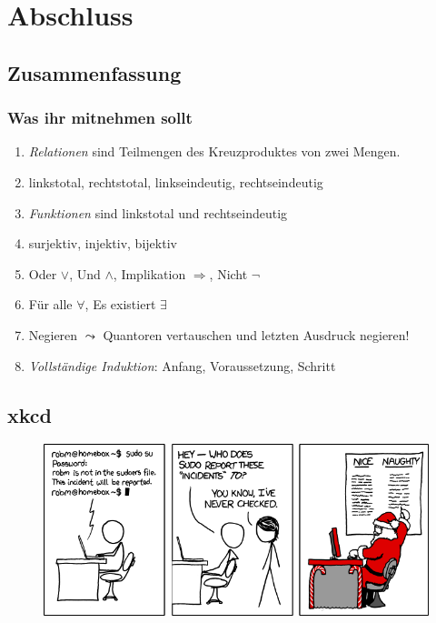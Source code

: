 \documentclass{beamer}
\begin{document}





\section{Abschluss}
\subsection{Zusammenfassung}
\begin{frame}
  \frametitle{Was ihr mitnehmen sollt}
  \begin{enumerate}
    \item \emph{Relationen} sind Teilmengen des Kreuzproduktes von zwei Mengen.
    \item linkstotal, rechtstotal, linkseindeutig, rechtseindeutig
    \item \emph{Funktionen} sind linkstotal und rechtseindeutig
    \item surjektiv, injektiv, bijektiv
    \item Oder $\vee$, Und $\wedge$, Implikation $\Rightarrow$, Nicht $\neg$
    \item Für alle $\forall$, Es existiert $\exists$
    \item Negieren $\leadsto$ Quantoren vertauschen und letzten Ausdruck negieren!
    \item \emph{Vollständige Induktion}: Anfang, Voraussetzung, Schritt
   \end{enumerate}
\end{frame}

\subsection{xkcd}
\begin{frame}[plain]
  \begin{figure}
    \begin{center}
      \includegraphics[width=320pt]{incident}
    \end{center}
  \end{figure}
\end{frame}
\end{document}
